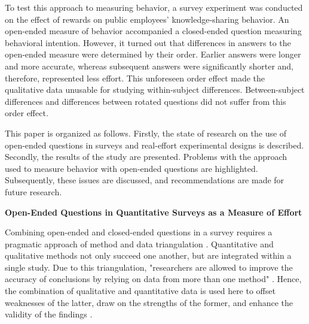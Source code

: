\documentclass{article}
\begin{document}
To test this approach to measuring behavior, a survey experiment was conducted on the effect of rewards on public employees' knowledge-sharing behavior. An open-ended measure of behavior accompanied a closed-ended question measuring behavioral intention. However, it turned out that differences in answers to the open-ended measure were determined by their order. Earlier answers were longer and more accurate, whereas subsequent answers were significantly shorter and, therefore, represented less effort. This unforeseen order effect made the qualitative data unusable for studying within-subject differences. Between-subject differences and differences between rotated questions did not suffer from this order effect. 

This paper is organized as follows. Firstly, the state of research on the use of open-ended questions in surveys and real-effort experimental designs is described. Secondly, the results of the study are presented. Problems with the approach used to measure behavior with open-ended questions are highlighted. Subsequently, these issues are discussed, and recommendations are made for future research. 

\textbf{Open-Ended Questions in Quantitative Surveys as a Measure of Effort }

Combining open-ended and closed-ended questions in a survey requires a pragmatic approach of method and data triangulation \parencite[pp. 631][]{Rossman1985}. Quantitative and qualitative methods not only succeed one another, but are integrated within a single study. Due to this triangulation, "researchers are allowed to improve the accuracy of conclusions by relying on data from more than one method" \parencite[pp. 632][]{Rossman1985}. Hence, the combination of qualitative and quantitative data is used here to offset weaknesses of the latter, draw on the strengths of the former, and enhance the validity of the findings \parencite[pp. 105][]{Bryman2006, Dewasiri2018}.
\end{document}
